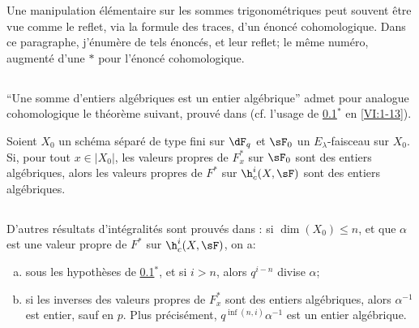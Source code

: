 Une manipulation élémentaire sur les sommes trigonométriques peut souvent 
être vue comme le reflet, via la formule des traces, d'un énoncé 
cohomologique. Dans ce paragraphe, j'énumère de tels énoncés, et leur 
reflet;  le même numéro, augmenté d'une $\ast$ pour 
l'énoncé cohomologique. 





\subsection{}\label{VI:2-1}

``Une somme d'entiers algébriques est un entier algébrique'' admet pour 
analogue cohomologique le théorème suivant, prouvé dans 
 (cf. l'usage de \ref{VI:2-1}$^\ast$ en 
\ref{VI:1-13}). 





\begin{theorem*}[2.1*]\label{VI:2-1*}
Soient $X_0$ un schéma séparé de type fini sur $\dF_q$ et $\sF_0$ un 
$E_\lambda$-faisceau sur $X_0$. Si, pour tout $x\in |X_0|$, les valeurs 
propres de $F_x^\ast$ sur $\sF_0$ sont des entiers algébriques, alors les 
valeurs propres de $F^\ast$ sur $\h_c^i(X,\sF)$ sont des entiers algébriques. 
\end{theorem*}





\subsection{}\label{VI:2-2}

D'autres résultats d'intégralités sont prouvés dans 
: si $\dim(X_0)\leqslant n$, et que $\alpha$ est 
une valeur propre de $F^\ast$ sur $\h_c^i(X,\sF)$, on a: 
\begin{enumerate}[a)]
  \item sous les hypothèses de \ref{VI:2-1}$^\ast$, et si $i>n$, alors 
    $q^{i-n}$ divise $\alpha$;
  \item si les inverses des valeurs propres de $F_x^\ast$ sont des entiers 
    algébriques, alors $\alpha^{-1}$ est entier, sauf en $p$. Plus 
    précisément, $q^{\inf(n,i)}\alpha^{-1}$ est un entier algébrique. 
\end{enumerate}

